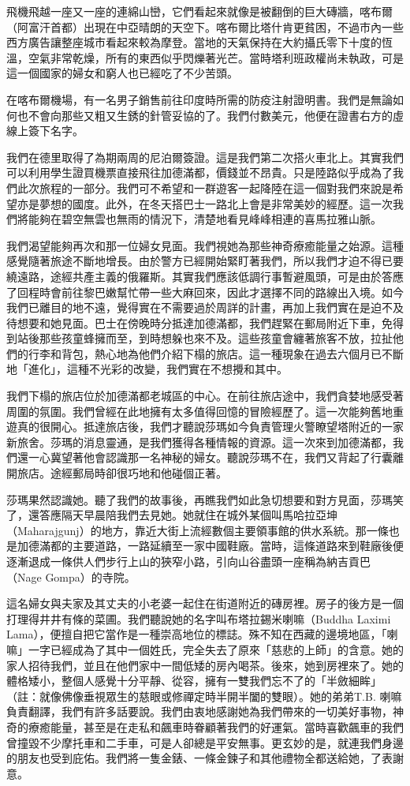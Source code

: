 飛機飛越一座又一座的連綿山巒，它們看起來就像是被翻倒的巨大磚牆，喀布爾（阿富汗首都）出現在中亞晴朗的天空下。喀布爾比塔什肯更貧困，不過市內一些西方廣告讓整座城市看起來較為摩登。當地的天氣保持在大約攝氏零下十度的恆溫，空氣非常乾燥，所有的東西似乎閃爍著光芒。當時塔利班政權尚未執政，可是這一個國家的婦女和窮人也已經吃了不少苦頭。

在喀布爾機場，有一名男子銷售前往印度時所需的防疫注射證明書。我們是無論如何也不會向那些又粗又生銹的針管妥協的了。我們付數美元，他便在證書右方的虛線上簽下名字。

我們在德里取得了為期兩周的尼泊爾簽證。這是我們第二次搭火車北上。其實我們可以利用學生證買機票直接飛往加德滿都，價錢並不昂貴。只是陸路似乎成為了我們此次旅程的一部分。我們可不希望和一群遊客一起降陸在這一個對我們來說是希望亦是夢想的國度。此外，在冬天搭巴士一路北上會是非常美妙的經歷。這一次我們將能夠在碧空無雲也無雨的情況下，清楚地看見峰峰相連的喜馬拉雅山脈。

我們渴望能夠再次和那一位婦女見面。我們視她為那些神奇療癒能量之始源。這種感覺隨著旅途不斷地增長。由於警方已經開始緊盯著我們，所以我們才迫不得已要繞遠路，途經共產主義的俄羅斯。其實我們應該低調行事暫避風頭，可是由於答應了回程時會前往黎巴嫩幫忙帶一些大麻回來，因此才選擇不同的路線出入境。如今我們已離目的地不遠，覺得實在不需要過於周詳的計畫，再加上我們實在是迫不及待想要和她見面。巴士在傍晚時分抵達加德滿都，我們趕緊在郵局附近下車，免得到站後那些孩童蜂擁而至，到時想躲也來不及。這些孩童會纏著旅客不放，拉扯他們的行李和背包，熱心地為他們介紹下榻的旅店。這一種現象在過去六個月已不斷地「進化」，這種不光彩的改變，我們實在不想攪和其中。

我們下榻的旅店位於加德滿都老城區的中心。在前往旅店途中，我們貪婪地感受著周圍的氛圍。我們曾經在此地擁有太多值得回憶的冒險經歷了。這一次能夠舊地重遊真的很開心。抵達旅店後，我們才聽說莎瑪如今負責管理火警瞭望塔附近的一家新旅舍。莎瑪的消息靈通，是我們獲得各種情報的資源。這一次來到加德滿都，我們還一心冀望著他會認識那一名神秘的婦女。聽說莎瑪不在，我們又背起了行囊離開旅店。途經郵局時卻很巧地和他碰個正著。

莎瑪果然認識她。聽了我們的故事後，再瞧我們如此急切想要和對方見面，莎瑪笑了，還答應隔天早晨陪我們去見她。她就住在城外某個叫馬哈拉亞坤（Maharajgunj）的地方，靠近大街上流經數個主要領事館的供水系統。那一條也是加德滿都的主要道路，一路延續至一家中國鞋廠。當時，這條道路來到鞋廠後便逐漸退成一條供人們步行上山的狹窄小路，引向山谷盡頭一座稱為納吉貢巴（Nage
Gompa）的寺院。

這名婦女與夫家及其丈夫的小老婆一起住在街道附近的磚房裡。房子的後方是一個打理得井井有條的菜圃。我們聽說她的名字叫布塔拉錫米喇嘛（Buddha
Laximi
Lama），便擅自把它當作是一種崇高地位的標誌。殊不知在西藏的邊境地區，「喇嘛」一字已經成為了其中一個姓氏，完全失去了原來「慈悲的上師」的含意。她的家人招待我們，並且在他們家中一間低矮的房內喝茶。後來，她到房裡來了。她的體格矮小，整個人感覺十分平靜、從容，擁有一雙我們忘不了的「半斂細眸」（註：就像佛像垂視眾生的慈眼或修禪定時半開半闔的雙眼）。她的弟弟T.B.
喇嘛負責翻譯，我們有許多話要說。我們由衷地感謝她為我們帶來的一切美好事物，神奇的療癒能量，甚至是在走私和飆車時眷顧著我們的好運氣。當時喜歡飆車的我們曾撞毀不少摩托車和二手車，可是人卻總是平安無事。更玄妙的是，就連我們身邊的朋友也受到庇佑。我們將一隻金錶、一條金鍊子和其他禮物全都送給她，了表謝意。

